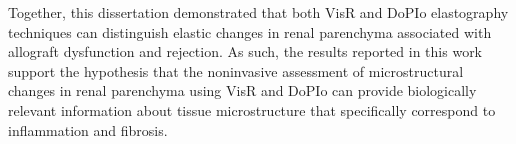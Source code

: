 
Together, this dissertation demonstrated that both VisR and DoPIo elastography techniques can distinguish elastic changes in renal parenchyma associated with allograft dysfunction and rejection. As such, the results reported in this work support the hypothesis that the noninvasive assessment of microstructural changes in renal parenchyma using VisR and DoPIo can provide biologically relevant information about tissue microstructure that specifically correspond to inflammation and fibrosis.




